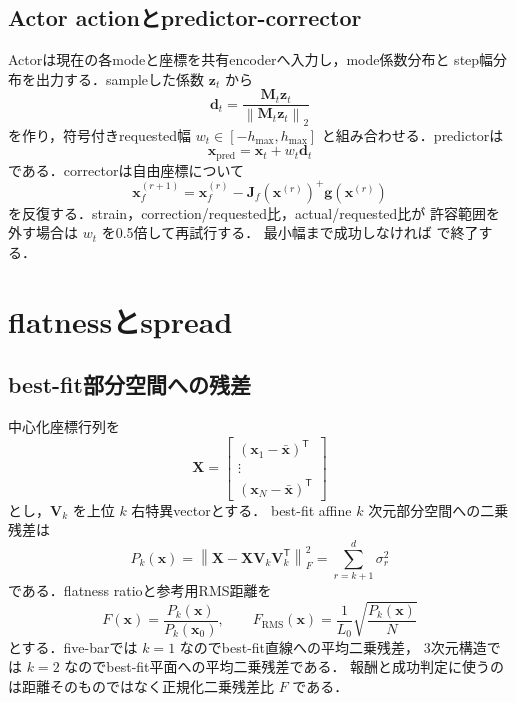 \documentclass[a4paper,11pt]{ltjsarticle}
\newcommand{\norm}[1]{\left\lVert #1\right\rVert}
\newcommand{\Code}[1]{\texttt{\detokenize{#1}}}
\begin{document}
\subsection{Actor actionとpredictor-corrector}

Actorは現在の各modeと座標を共有encoderへ入力し，mode係数分布と
step幅分布を出力する．sampleした係数 $\bm z_t$ から
\begin{equation}
 \bm d_t=
 \frac{\bm M_t\bm z_t}{\norm{\bm M_t\bm z_t}_2}
\end{equation}
を作り，符号付きrequested幅
$w_t\in[-h_{\max},h_{\max}]$ と組み合わせる．predictorは
\begin{equation}
 \bm x_{\mathrm{pred}}=\bm x_t+w_t\bm d_t
\end{equation}
である．correctorは自由座標について
\begin{equation}
 \bm x_f^{(r+1)}
 =\bm x_f^{(r)}
 -\bm J_f(\bm x^{(r)})^+
   \bm g(\bm x^{(r)})
 \label{eq:corrector}
\end{equation}
を反復する．strain，correction/requested比，actual/requested比が
許容範囲を外す場合は $w_t$ を0.5倍して再試行する．
最小幅まで成功しなければ \Code{correction_failed} で終了する．

\section{flatnessとspread}
\label{sec:geometry}

\subsection{best-fit部分空間への残差}

中心化座標行列を
\begin{equation}
 \bm X=
 \begin{bmatrix}
  (\bm x_1-\bar{\bm x})^\mathsf T\\
  \vdots\\
  (\bm x_N-\bar{\bm x})^\mathsf T
 \end{bmatrix}
\end{equation}
とし，$\bm V_k$ を上位 $k$ 右特異vectorとする．
best-fit affine $k$ 次元部分空間への二乗残差は
\begin{equation}
 P_k(\bm x)=
 \norm{\bm X-\bm X\bm V_k\bm V_k^\mathsf T}_F^2
 =\sum_{r=k+1}^{d}\sigma_r^2
\end{equation}
である．flatness ratioと参考用RMS距離を
\begin{equation}
 F(\bm x)=\frac{P_k(\bm x)}{P_k(\bm x_0)},\qquad
 F_{\mathrm{RMS}}(\bm x)=
 \frac{1}{L_0}\sqrt{\frac{P_k(\bm x)}N}
 \label{eq:flatness}
\end{equation}
とする．five-barでは $k=1$ なのでbest-fit直線への平均二乗残差，
3次元構造では $k=2$ なのでbest-fit平面への平均二乗残差である．
報酬と成功判定に使うのは距離そのものではなく正規化二乗残差比 $F$ である．
\end{document}
